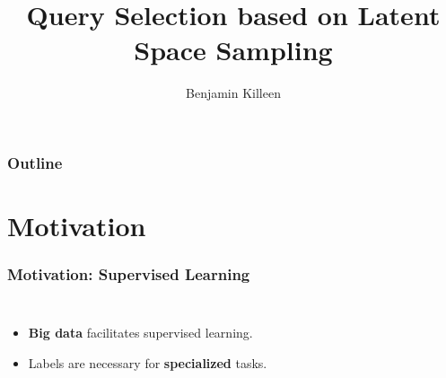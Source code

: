 \documentclass[10pt, usenames, dvipsnames, table]{beamer}
\title{Query Selection based on Latent Space Sampling}
\author{Benjamin Killeen}
\date{}
\begin{document}
\begin{frame}
  \titlepage
\end{frame}

\begin{frame}
  \frametitle{Outline}
  \tableofcontents
\end{frame}


\section{Motivation}
\label{sec:motivation}

\begin{frame}
  \frametitle{Motivation: Supervised Learning}
  \begin{columns}
    \begin{itemize}
    \item<1-> \textbf{Big data} facilitates supervised learning.
    \item<3-> Labels are necessary for \textbf{specialized} tasks.
    \end{itemize}
    \vspace{2em}
  \end{columns}
\end{frame}
\end{document}
